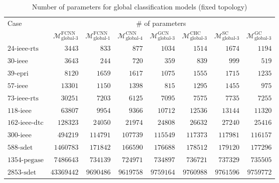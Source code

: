 \documentclass[journal]{IEEEtran}
\begin{document}
\begin{table*}[!ht]
\small
\caption{Number of parameters for global classification models (fixed topology)}
\label{tab:params_clf_global}
\def\na{---}
\centering
    \begin{tabular}{lr|rrrrrr}
    \toprule
    \multirow{2}{*}{Case} & \multicolumn{7}{c}{\# of parameters} \\ 
    \cmidrule(r){2-8}
    & $\mathcal{M}^{\textrm{FCNN}}_{\textrm{global-3}}$ & $\mathcal{M}^{\textrm{FCNN}}_{\textrm{global-1}}$ & $\mathcal{M}^{\textrm{CNN}}_{\textrm{global-4}}$ & $\mathcal{M}^{\textrm{GCN}}_{\textrm{global-3}}$ & $\mathcal{M}^{\textrm{CHC}}_{\textrm{global-3}}$ & $\mathcal{M}^{\textrm{SC}}_{\textrm{global-3}}$ & $\mathcal{M}^{\textrm{GC}}_{\textrm{global-3}}$ \\
    \midrule
    $\textrm{24-ieee-rts}$ & $3443$ & $833$ & $877$ & $1034$ & $1514$ & $1674$ & $1194$ \\
    $\textrm{30-ieee}$ & $3643$ & $244$ & $720$ & $359$ & $839$ & $999$ & $519$ \\
    $\textrm{39-epri}$ & $8120$ & $1659$ & $1617$ & $1075$ & $1555$ & $1715$ & $1235$ \\
    $\textrm{57-ieee}$ & $13301$ & $1150$ & $1398$ & $815$ & $1295$ & $1455$ & $975$ \\
    $\textrm{73-ieee-rts}$ & $30251$ & $7203$ & $6125$ & $7095$ & $7575$ & $7735$ & $7255$ \\
    $\textrm{118-ieee}$ & $63807$ & $9954$ & $9366$ & $10712$ & $12536$ & $13144$ & $11320$ \\
    $\textrm{162-ieee-dtc}$ & $128323$ & $24050$ & $21974$ & $24808$ & $26632$ & $27240$ & $25416$ \\
    $\textrm{300-ieee}$ & $494219$ & $114791$ & $107739$ & $115549$ & $117373$ & $117981$ & $116157$ \\
    $\textrm{588-sdet}$ & $1460783$ & $171842$ & $166590$ & $176688$ & $178512$ & $179120$ & $177296$ \\
    $\textrm{1354-pegase}$ & $7486643$ & $734139$ & $724971$ & $734897$ & $736721$ & $737329$ & $735505$ \\
    $\textrm{2853-sdet}$ & $43369442$ & $9690486$ & $9619758$ & $9759164$ & $9760988$ & $9761596$ & $9759772$ \\
    \bottomrule
    \end{tabular}
\end{table*}
\end{document}
